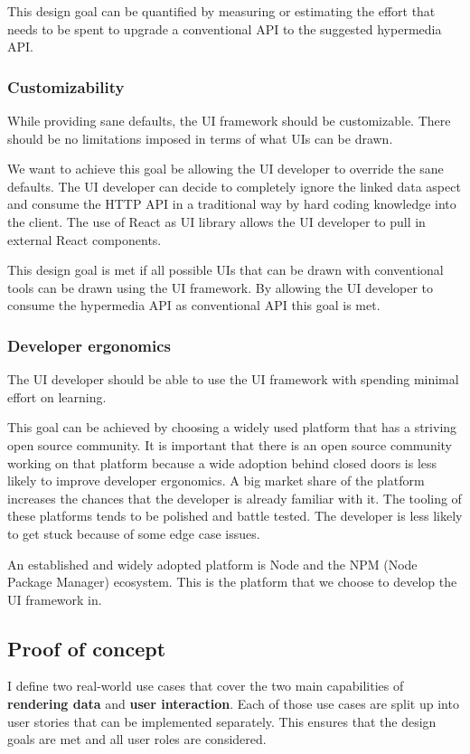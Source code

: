 This design goal can be quantified by measuring or estimating the effort that needs to be spent to upgrade a conventional API to the suggested hypermedia API.

\subsubsection{Customizability}\label{usecases}
While providing sane defaults, the UI framework should be customizable. There should be no limitations imposed in terms of what UIs can be drawn.

We want to achieve this goal be allowing the UI developer to override the sane defaults. The UI developer can decide to completely ignore the linked data aspect and consume the HTTP API in a traditional way by hard coding knowledge into the client. The use of React as UI library allows the UI developer to pull in external React components.

This design goal is met if all possible UIs that can be drawn with conventional tools can be drawn using the UI framework. By allowing the UI developer to consume the hypermedia API as conventional API this goal is met.

\subsubsection{Developer ergonomics}\label{usecases}
The UI developer should be able to use the UI framework with spending minimal effort on learning.

This goal can be achieved by choosing a widely used platform that has a striving open source community. It is important that there is an open source community working on that platform because a wide adoption behind closed doors is less likely to improve developer ergonomics.
A big market share of the platform increases the chances that the developer is already familiar with it. The tooling of these platforms tends to be polished and battle tested. The developer is less likely to get stuck because of some edge case issues.

An established and widely adopted platform is Node and the NPM (Node Package Manager) ecosystem. This is the platform that we choose to develop the UI framework in.

\subsection{Proof of concept}
I define two real-world use cases that cover the two main capabilities of \textbf{rendering data} and \textbf{user interaction}. Each of those use cases are split up into user stories that can be implemented separately. This ensures that the design goals are met and all user roles are considered.

